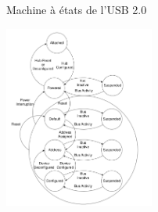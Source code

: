 \documentclass[french]{beamer}
\begin{document}
\begin{frame}

Machine à états de l'USB 2.0

\begin{center}
 \includegraphics[height=6cm]{images/machine_etat_USB2.0.png}
\end{center}

\end{frame}




\end{document}
